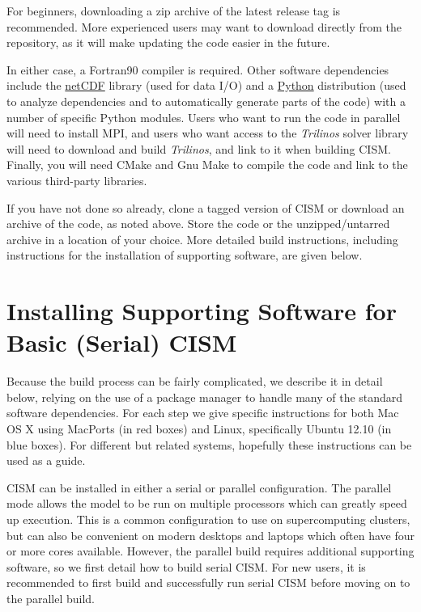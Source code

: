 For beginners, downloading a zip archive of the latest release tag is recommended. 
More experienced users may want to download directly from the repository, 
as it will make updating the code easier in the future.

In either case, a Fortran90 compiler is required.  
Other software dependencies include the \href{http://www.unidata.ucar.edu/packages/netcdf/index.html}{netCDF} library 
(used for data I/O) and a \href{http://www.python.org}{Python} distribution 
(used to analyze dependencies and to automatically generate parts of the code) 
with a number of specific Python modules. Users who want to run the code in parallel will need to install MPI, 
and users who want access to the \textit{Trilinos} solver library will need to 
download and build \textit{Trilinos}, and link to it when building CISM. 
Finally, you will need CMake and Gnu Make to compile the code and link to the various third-party libraries. 

If you have not done so already, clone a tagged version of CISM or download an archive of the code, as noted above. Store the code or the unzipped/untarred archive in a location of your choice. More detailed build instructions, including instructions for the installation of supporting software, are given below.

\section{Installing Supporting Software for Basic (Serial) CISM}

Because the build process can be fairly complicated, we describe it in detail below, 
relying on the use of a package manager to handle many of the standard software dependencies. 
For each step we give specific instructions for both Mac OS X using MacPorts (in red boxes) and
Linux, specifically Ubuntu 12.10 (in blue boxes).  For different but related systems,
hopefully these instructions can be used as a guide.

CISM can be installed in either a serial or parallel configuration. The parallel mode
allows the model to be run on multiple processors which can greatly speed up execution.
This is a common configuration to use on supercomputing clusters, but can also be 
convenient on modern desktops and laptops which often have four or more cores available.
However, the parallel build requires additional supporting software, so we first 
detail how to build serial CISM.  For new users, it is recommended to first build
and successfully run serial CISM before moving on to the parallel build.  

